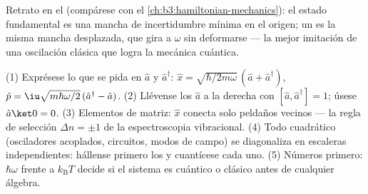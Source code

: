 \begin{omfigure}

{\small Retrato en el  (compárese con el
\cref{ch:b3:hamiltonian-mechanics}): el estado fundamental es una mancha de
incertidumbre mínima en el origen; un  es la misma mancha
desplazada, que gira a $\omega$ sin deformarse --- la mejor imitación de una
oscilación clásica que logra la mecánica cuántica.}
\end{omfigure}

\begin{method}\label{met:b3:harmonic-oscillator:method}
(1) Exprésese lo que se pida en $\hat a$ y $\hat a^\dagger$: $\hat x
= \sqrt{\hbar/2m\omega}\,(\hat a + \hat a^\dagger)$, $\hat p =
\iu\sqrt{m\hbar\omega/2}\,(\hat a^\dagger - \hat a)$. (2) Llévense los
$\hat a$ a la derecha con $[\hat a, \hat a^\dagger] = 1$; úsese
$\hat a\ket0 = 0$. (3) Elementos de matriz: $\hat x$ conecta solo peldaños
vecinos --- la regla de selección $\Delta n = \pm1$ de la espectroscopia
vibracional. (4) Todo  cuadrático (osciladores acoplados,
circuitos, modos de campo) se diagonaliza en escaleras independientes:
hállense primero los  y cuantícese cada uno. (5) Números
primero: $\hbar\omega$ frente a $k_{\text{B}}T$ decide si el sistema es
cuántico o clásico antes de cualquier álgebra.
\end{method}

